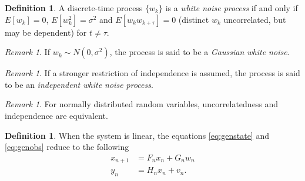 \documentclass{article}
\theoremstyle{definition}
\newtheorem{definition}[thm]{Definition}
\theoremstyle{remark}
\newtheorem{remark}[thm]{Remark}
\begin{document}
\begin{definition} A discrete-time process $\{w_k\}$ is a \emph{white noise process} if and only if 
$E[w_k]=0$, $E[w_k^2]=\sigma^2$ and $E[w_kw_{k+\tau}]=0$ (distinct $w_k$ uncorrelated, but may be dependent) for $t \neq \tau$.
\end{definition}

\begin{remark}
If $w_k \sim N(0, \sigma^2)$, the process is said to be a \emph{Gaussian white noise}.
\end{remark}
\begin{remark}
If a stronger restriction of independence is assumed, the process is said to be an \emph{independent white noise process}.
\end{remark}
\begin{remark}
For normally distributed random variables, uncorrelatedness and independence are equivalent.
\end{remark}


\begin{definition}
When the system is linear, the equations \eqref{eq:genstate} and \eqref{eq:genobs} reduce to the following 
\begin{align}
x_{n+1}&=F_{n}x_n+G_nw_n\label{eq:linstate}\\
y_{n}&=H_nx_n+v_n.\label{eq:linobs}
\end{align}
\end{definition}








\end{document}

